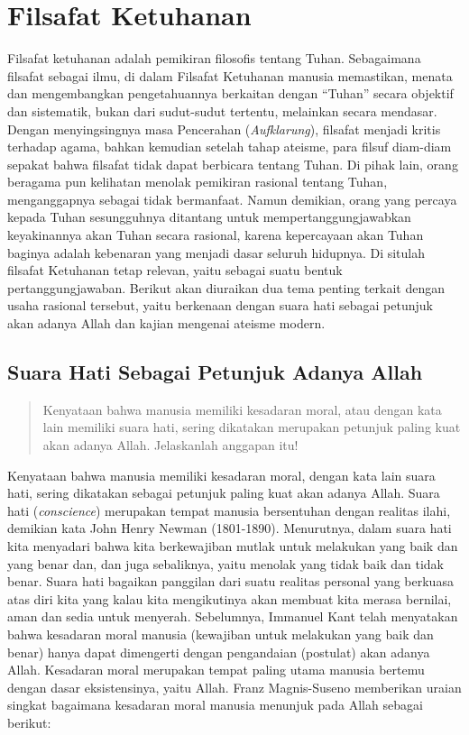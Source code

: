 \documentclass[11pt,twoside,a5paper,openany]{memoir}
\begin{document}
\hypertarget{filsafat-ketuhanan}{%
\chapter{Filsafat Ketuhanan}\label{filsafat-ketuhanan}}

Filsafat ketuhanan adalah pemikiran filosofis tentang Tuhan. Sebagaimana
filsafat sebagai ilmu, di dalam Filsafat Ketuhanan manusia memastikan,
menata dan mengembangkan pengetahuannya berkaitan dengan ``Tuhan''
secara objektif dan sistematik, bukan dari sudut-sudut tertentu,
melainkan secara mendasar. Dengan menyingsingnya masa Pencerahan
(\emph{Aufklarung}), filsafat menjadi kritis terhadap agama, bahkan
kemudian setelah tahap ateisme, para filsuf diam-diam sepakat bahwa
filsafat tidak dapat berbicara tentang Tuhan. Di pihak lain, orang
beragama pun kelihatan menolak pemikiran rasional tentang Tuhan,
menganggapnya sebagai tidak bermanfaat. Namun demikian, orang yang
percaya kepada Tuhan sesungguhnya ditantang untuk mempertanggungjawabkan
keyakinannya akan Tuhan secara rasional, karena kepercayaan akan Tuhan
baginya adalah kebenaran yang menjadi dasar seluruh hidupnya. Di situlah
filsafat Ketuhanan tetap relevan, yaitu sebagai suatu bentuk
pertanggungjawaban. Berikut akan diuraikan dua tema penting terkait
dengan usaha rasional tersebut, yaitu berkenaan dengan suara hati
sebagai petunjuk akan adanya Allah dan kajian mengenai ateisme modern.

\hypertarget{suara-hati-sebagai-petunjuk-adanya-allah}{%
\section{Suara Hati Sebagai Petunjuk Adanya
Allah}\label{suara-hati-sebagai-petunjuk-adanya-allah}}

\begin{quote}
Kenyataan bahwa manusia memiliki kesadaran moral, atau dengan kata lain
memiliki suara hati, sering dikatakan merupakan petunjuk paling kuat
akan adanya Allah. Jelaskanlah anggapan itu!
\end{quote}

Kenyataan bahwa manusia memiliki kesadaran moral, dengan kata lain suara
hati, sering dikatakan sebagai petunjuk paling kuat akan adanya Allah.
Suara hati (\emph{conscience}) merupakan tempat manusia bersentuhan
dengan realitas ilahi, demikian kata John Henry Newman (1801-1890).
Menurutnya, dalam suara hati kita menyadari bahwa kita berkewajiban
mutlak untuk melakukan yang baik dan yang benar dan, dan juga
sebaliknya, yaitu menolak yang tidak baik dan tidak benar. Suara hati
bagaikan panggilan dari suatu realitas personal yang berkuasa atas diri
kita yang kalau kita mengikutinya akan membuat kita merasa bernilai,
aman dan sedia untuk menyerah. Sebelumnya, Immanuel Kant telah
menyatakan bahwa kesadaran moral manusia (kewajiban untuk melakukan yang
baik dan benar) hanya dapat dimengerti dengan pengandaian (postulat)
akan adanya Allah. Kesadaran moral merupakan tempat paling utama manusia
bertemu dengan dasar eksistensinya, yaitu Allah. Franz Magnis-Suseno
memberikan uraian singkat bagaimana kesadaran moral manusia menunjuk
pada Allah sebagai berikut:
\end{document}
